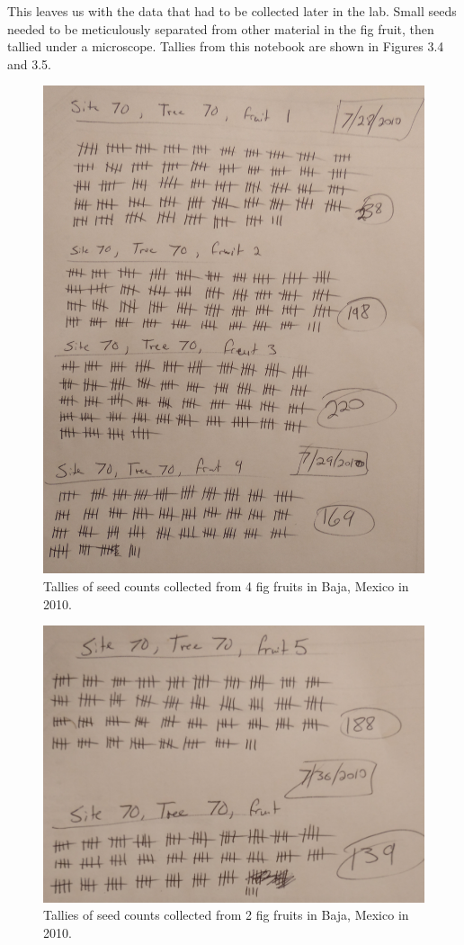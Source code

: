 \documentclass[
]{scrbook}
\begin{document}
This leaves us with the data that had to be collected later in the lab.
Small seeds needed to be meticulously separated from other material in the fig fruit, then tallied under a microscope.
Tallies from this notebook are shown in Figures 3.4 and 3.5.

\begin{figure}
\includegraphics[width=1\linewidth]{img/Ch1_Ex1_seeds1} \caption{Tallies of seed counts collected from 4 fig fruits in Baja, Mexico in 2010.}\label{fig:unnamed-chunk-11}
\end{figure}

\begin{figure}
\includegraphics[width=1\linewidth]{img/Ch1_Ex1_seeds2} \caption{Tallies of seed counts collected from 2 fig fruits in Baja, Mexico in 2010.}\label{fig:unnamed-chunk-12}
\end{figure}
\end{document}
